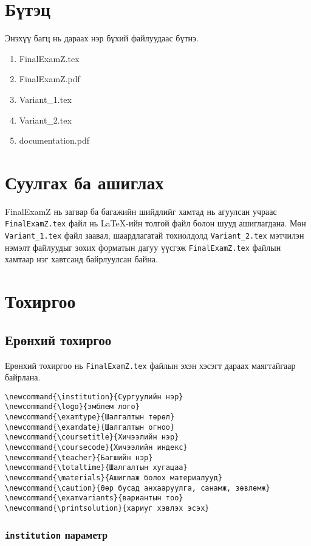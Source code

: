\documentclass[10pt]{article}
\theoremstyle{definition}
\begin{document}
\section{Бүтэц}

Энэхүү багц нь дараах нэр бүхий файлуудаас бүтнэ.
\begin{enumerate}
 \item FinalExamZ.tex
 \item FinalExamZ.pdf
 \item Variant\_1.tex
 \item Variant\_2.tex
 \item documentation.pdf
\end{enumerate}

\section{Суулгах ба ашиглах}

FinalExamZ нь загвар ба багажийн шийдлийг хамтад нь агуулсан учраас \texttt{FinalExamZ.tex} файл нь \LaTeX-ийн толгой файл болон шууд ашиглагдана. Мөн \texttt{Variant\_1.tex} файл заавал, шаардлагатай тохиолдолд \texttt{Variant\_2.tex} мэтчилэн нэмэлт файлуудыг зохих форматын дагуу үүсгэж \texttt{FinalExamZ.tex} файлын хамтаар нэг хавтсанд байрлуулсан байна.

\section{Тохиргоо}

\subsection{Ерөнхий тохиргоо}

Ерөнхий тохиргоо нь \texttt{FinalExamZ.tex} файлын эхэн хэсэгт дараах маягтайгаар байрлана.
\begin{verbatim}
\newcommand{\institution}{Сургуулийн нэр}
\newcommand{\logo}{эмблем лого}
\newcommand{\examtype}{Шалгалтын төрөл}
\newcommand{\examdate}{Шалгалтын огноо}
\newcommand{\coursetitle}{Хичээлийн нэр}
\newcommand{\coursecode}{Хичээлийн индекс}
\newcommand{\teacher}{Багшийн нэр}
\newcommand{\totaltime}{Шалгалтын хугацаа}
\newcommand{\materials}{Ашиглаж болох материалууд}
\newcommand{\caution}{Өөр бусад анхааруулга, санамж, зөвлөмж}
\newcommand{\examvariants}{вариантын тоо}
\newcommand{\printsolution}{хариуг хэвлэх эсэх}
\end{verbatim}

\subsubsection{\texttt{institution} параметр}
\end{document}
